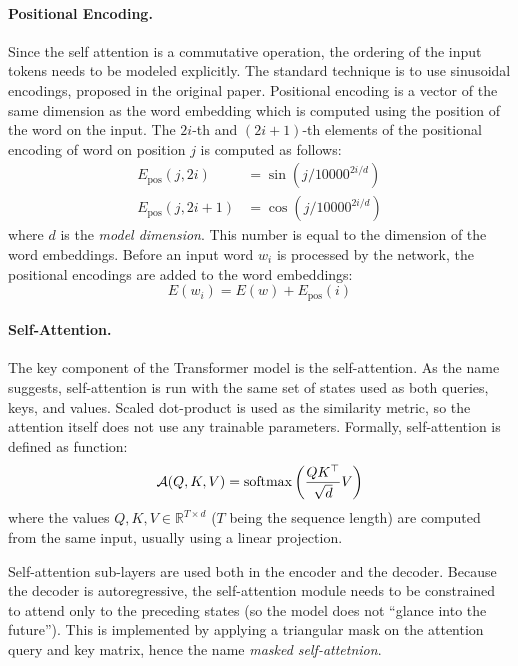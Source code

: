 \paragraph{Positional Encoding.} Since the self attention is a commutative
operation, the ordering of the input tokens needs to be modeled explicitly.
The standard technique is to use sinusoidal encodings, proposed in the original
paper. Positional encoding is a vector of the same dimension as the word
embedding which is computed using the position of the word on the input.
The $2i$-th and $(2i+1)$-th elements of the positional encoding of word on
position $j$ is computed as follows:
%
\begin{equation}
  \begin{split}
    E_{\text{pos}}(j, 2i) &= \sin(j / 10000^{2i/d}) \\
    E_{\text{pos}}(j, 2i + 1) &= \cos(j / 10000^{2i/d})
  \end{split}
\end{equation}
%
where $d$ is the \emph{model dimension}. This number is equal to the dimension
of the word embeddings. Before an input word $w_i$ is processed by the network,
the positional encodings are added to the word embeddings:
\begin{equation}
  E(w_i) = E(w) + E_{\text{pos}}(i)
\end{equation}

\paragraph{Self-Attention.} The key component of the Transformer model is the
self-attention. As the name suggests, self-attention is run with the same set
of states used as both queries, keys, and values. Scaled dot-product is used as
the similarity metric, so the attention itself does not use any trainable
parameters. Formally, self-attention is defined as function:
%
\begin{equation}
  \mathcal{A}(Q,K,V) = \operatorname*{softmax} \left( \frac{QK^\top}{\sqrt{d}} V  \right)
  \label{eq:scaled-dot-product}
\end{equation}
%
where the values $Q, K, V \in \mathbb{R}^{T \times d}$ ($T$ being the sequence
length) are computed from the same input, usually using a linear projection.

Self-attention sub-layers are used both in the encoder and the decoder. Because
the decoder is autoregressive, the self-attention module needs to be
constrained to attend only to the preceding states (so the model does not
``glance into the future''). This is implemented by applying a triangular mask
on the attention query and key matrix, hence the name \emph{masked
  self-attetnion}.

